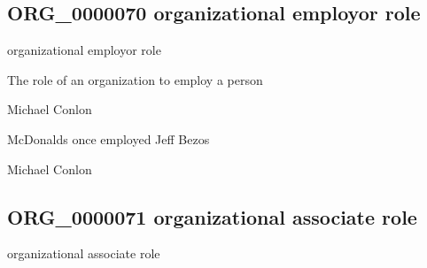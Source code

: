 \documentclass[letterpaper,10pt,english]{sphinxmanual}
\begin{document}
\subsection{ORG\_0000070 \sphinxhyphen{} organizational employor role}
\label{\detokenize{doc-ORG_0000070:org-0000070-organizational-employor-role}}\label{\detokenize{doc-ORG_0000070:index-0}}\label{\detokenize{doc-ORG_0000070::doc}}
\begin{sphinxShadowBox}

\sphinxAtStartPar
organizational employor role
\end{sphinxShadowBox}

\begin{sphinxShadowBox}

\sphinxAtStartPar
The role of an organization to employ a person
\end{sphinxShadowBox}

\begin{sphinxShadowBox}

\sphinxAtStartPar
Michael Conlon 
\end{sphinxShadowBox}

\begin{sphinxShadowBox}

\sphinxAtStartPar
McDonalds once employed Jeff Bezos
\end{sphinxShadowBox}

\begin{sphinxShadowBox}

\sphinxAtStartPar
Michael Conlon 
\end{sphinxShadowBox}
\begin{quote}

\ignorespaces \end{quote}


\subsection{ORG\_0000071 \sphinxhyphen{} organizational associate role}
\label{\detokenize{doc-ORG_0000071:org-0000071-organizational-associate-role}}\label{\detokenize{doc-ORG_0000071:index-0}}\label{\detokenize{doc-ORG_0000071::doc}}
\begin{sphinxShadowBox}

\sphinxAtStartPar
organizational associate role
\end{sphinxShadowBox}
\end{document}
